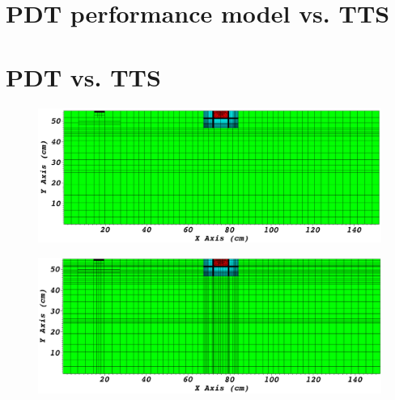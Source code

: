 \section{PDT performance model vs. TTS}

\section{PDT vs. TTS}

\begin{figure}[H]
\centering
\includegraphics[scale=0.3]{../../figures/level2_nocut.png}
\label{level2_nocut}
\caption{}
\end{figure}

\begin{figure}[H]
\centering
\includegraphics[scale=0.3]{../../figures/level2_42x13_balanced.png}
\caption{}
\label{level2_42x13_balanced}
\end{figure}

